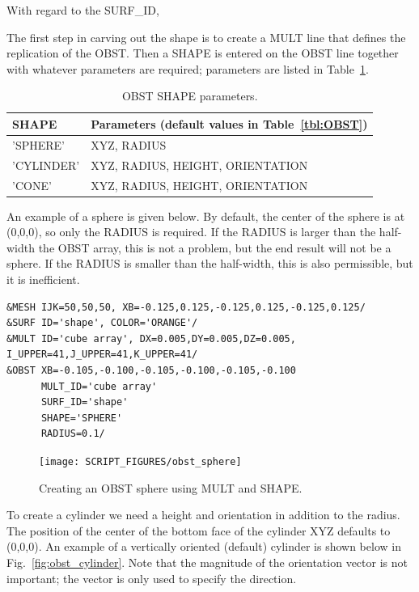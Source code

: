\documentclass[11pt]{book}
\begin{document}
With regard to the {\ct SURF\_ID},

The first step in carving out the shape is to create a {\ct MULT} line that defines the replication of the {\ct OBST}.  Then a {\ct SHAPE} is entered on the {\ct OBST} line together with whatever parameters are required; parameters are listed in Table~\ref{tab:obst_shape}.

\begin{table}[ht]
\caption[{\ct OBST SHAPE} parameters]{{\ct OBST SHAPE} parameters.}
\label{tab:obst_shape}
\centering
\begin{tabular}{|ll|}
\hline
{\ct SHAPE} \hfill   & Parameters (default values in Table~\ref{tbl:OBST})    \hfill    \\ \hline
{\ct 'SPHERE'}       & {\ct XYZ}, {\ct RADIUS}                                  \\
{\ct 'CYLINDER'}     & {\ct XYZ}, {\ct RADIUS}, {\ct HEIGHT}, {\ct ORIENTATION} \\
{\ct 'CONE'}         & {\ct XYZ}, {\ct RADIUS}, {\ct HEIGHT}, {\ct ORIENTATION} \\ \hline
\end{tabular}
\end{table}

An example of a sphere is given below.  By default, the center of the sphere is at (0,0,0), so only the {\ct RADIUS} is required.  If the {\ct RADIUS} is larger than the half-width the {\ct OBST} array, this is not a problem, but the end result will not be a sphere.  If the {\ct RADIUS} is smaller than the half-width, this is also permissible, but it is inefficient.

\begin{lstlisting}
&MESH IJK=50,50,50, XB=-0.125,0.125,-0.125,0.125,-0.125,0.125/
&SURF ID='shape', COLOR='ORANGE'/
&MULT ID='cube array', DX=0.005,DY=0.005,DZ=0.005, I_UPPER=41,J_UPPER=41,K_UPPER=41/
&OBST XB=-0.105,-0.100,-0.105,-0.100,-0.105,-0.100
      MULT_ID='cube array'
      SURF_ID='shape'
      SHAPE='SPHERE'
      RADIUS=0.1/
\end{lstlisting}

\begin{figure}[ht]
\centering
\texttt{[image: SCRIPT\_FIGURES/obst\_sphere]}
\caption[Creating an {\ct OBST} sphere using {\ct MULT} and {\ct SHAPE}]{Creating an {\ct OBST} sphere using {\ct MULT} and {\ct SHAPE}.}
\label{fig:obst_sphere}
\end{figure}

To create a cylinder we need a height and orientation in addition to the radius.  The position of the center of the bottom face of the cylinder {\ct XYZ} defaults to (0,0,0).  An example of a vertically oriented (default) cylinder is shown below in Fig.~\ref{fig:obst_cylinder}.  Note that the magnitude of the orientation vector is not important; the vector is only used to specify the direction.
\end{document}
